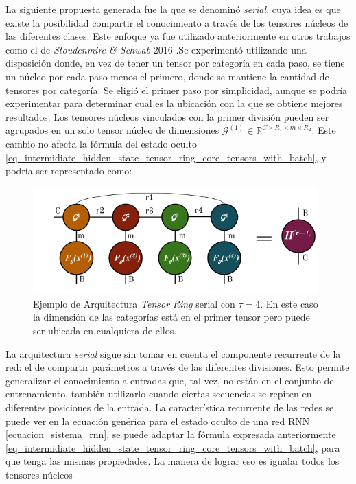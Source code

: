 \documentclass[spanish]{article}
\theoremstyle{definition}
\theoremstyle{remark}
\numberwithin{equation}{section}
\numberwithin{equation}{section} %
\begin{document}
\par
La siguiente propuesta generada fue la que se denominó \textit{serial}, cuya idea es que existe la posibilidad compartir el conocimiento a través de los tensores núcleos de las diferentes clases. Este enfoque ya fue utilizado anteriormente en otros trabajos como el de \textit{Stoudenmire \& Schwab} 2016 \cite{stoudenmire2016supervised}.Se experimentó utilizando una disposición donde, en vez de tener un tensor por categoría en cada paso, se tiene un núcleo por cada paso menos el primero, donde se mantiene la cantidad de tensores por categoría. Se eligió el primer paso por simplicidad, aunque se podría experimentar para determinar cual es la ubicación con la que se obtiene mejores resultados. Los tensores núcleos vinculados con la primer división pueden ser agrupados en un solo tensor núcleo de dimensiones $\mathcal{G}^{(1)} \in \mathbb{R}^{C \times R_1 \times m \times R_2}$. Este cambio no afecta la fórmula del estado oculto \eqref{eq_intermidiate_hidden_state_tensor_ring_core_tensors_with_batch}, y podría ser representado como:   
\begin{figure}[H]
 \centering
 \includegraphics[width=11cm]{img/ejemplo_arquitectura_serializada.png} \caption[Arquitectura \textit{Tensor Ring} serial]{\footnotesize{Ejemplo de Arquitectura \textit{Tensor Ring} serial} con $\tau=4$. En este caso la dimensión de las categorías está en el primer tensor pero puede ser ubicada en cualquiera de ellos. }
\label{fig:arquitecture_serialized}
\end{figure}\par
La arquitectura \textit{serial} sigue sin tomar en cuenta el componente recurrente de la red: el de compartir parámetros a través de las diferentes divisiones. Esto permite generalizar el conocimiento a entradas que, tal vez, no están en el conjunto de entrenamiento, también utilizarlo cuando ciertas secuencias se repiten en diferentes posiciones de la entrada. La característica recurrente de las redes se puede ver en la ecuación genérica para el estado oculto de una red RNN \eqref{ecuacion_sistema_rnn}, se puede adaptar la fórmula expresada anteriormente \eqref{eq_intermidiate_hidden_state_tensor_ring_core_tensors_with_batch}, para que tenga las mismas propiedades. La manera de lograr eso es igualar todos los tensores núcleos 
\end{document}
